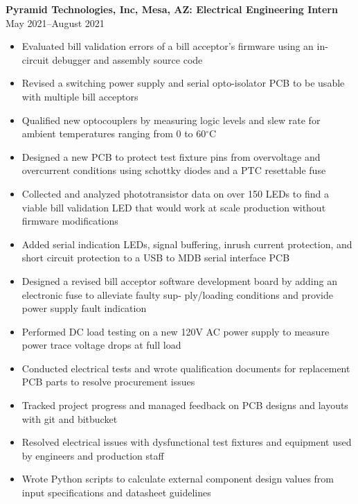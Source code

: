\documentclass{article}
\begin{document}
\textbf{Pyramid Technologies, Inc, Mesa, AZ: Electrical Engineering Intern}
\hfill 
\vspace{0.5em}
May 2021--August 2021
\begin{itemize}
\item{Evaluated bill validation errors of a bill acceptor's firmware using an in-circuit debugger and assembly source code}
\item{Revised a switching power supply and serial opto-isolator PCB to be usable with multiple bill acceptors}
\item{Qualified new optocouplers by measuring logic levels and slew rate for ambient temperatures ranging from 0 to 60$^{\circ}$C}
\item{Designed a new PCB to protect test fixture pins from overvoltage and overcurrent conditions
	using schottky diodes and a PTC resettable fuse}
\item{Collected and analyzed phototransistor data on over 150 LEDs to find a viable bill validation
	LED that would work at scale production without firmware modifications}
\item{Added serial indication LEDs, signal buffering, inrush current protection, and short circuit protection to a USB to MDB serial interface PCB}
\item{Designed a revised bill acceptor software development board by adding an electronic fuse to alleviate faulty sup-
	ply/loading conditions and provide power supply fault indication}
\item{Performed DC load testing on a new 120V AC power supply to measure power trace voltage drops at full load}
\item{Conducted electrical tests and wrote qualification documents for replacement PCB parts to resolve procurement issues}
\item{Tracked project progress and managed feedback on PCB designs and layouts with git and bitbucket}
\item{Resolved electrical issues with dysfunctional test fixtures and equipment used by engineers and production staff}
\item{Wrote Python scripts to calculate external component design values from input specifications and datasheet guidelines}
\end{itemize}
\end{document}
